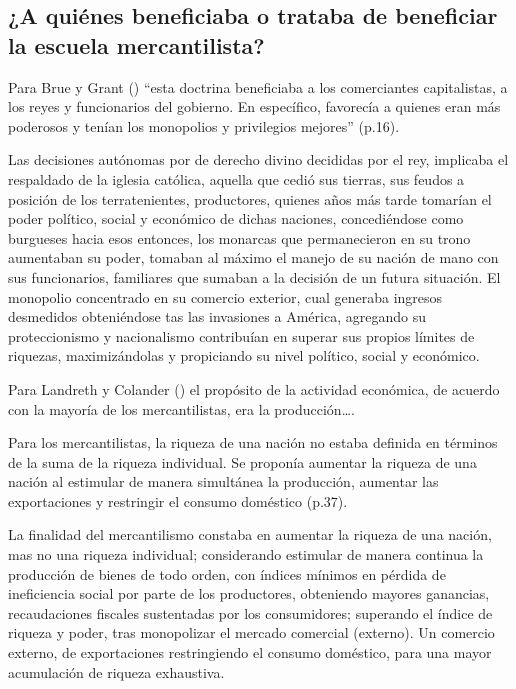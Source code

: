 \documentclass[
  jou,
  floatsintext,
  longtable,
  a4paper,
  nolmodern,
  notxfonts,
  notimes,
  colorlinks=true,linkcolor=blue,citecolor=blue,urlcolor=blue]{apa7}
\begin{document}
\subsection{¿A quiénes beneficiaba o trataba de beneficiar la escuela
mercantilista?}\label{a-quiuxe9nes-beneficiaba-o-trataba-de-beneficiar-la-escuela-mercantilista}

Para Brue y Grant
() ``esta
doctrina beneficiaba a los comerciantes capitalistas, a los reyes y
funcionarios del gobierno. En específico, favorecía a quienes eran más
poderosos y tenían los monopolios y privilegios mejores'' (p.16).

Las decisiones autónomas por de derecho divino decididas por el rey,
implicaba el respaldado de la iglesia católica, aquella que cedió sus
tierras, sus feudos a posición de los terratenientes, productores,
quienes años más tarde tomarían el poder político, social y económico de
dichas naciones, concediéndose como burgueses hacia esos entonces, los
monarcas que permanecieron en su trono aumentaban su poder, tomaban al
máximo el manejo de su nación de mano con sus funcionarios, familiares
que sumaban a la decisión de un futura situación. El monopolio
concentrado en su comercio exterior, cual generaba ingresos desmedidos
obteniéndose tas las invasiones a América, agregando su proteccionismo y
nacionalismo contribuían en superar sus propios límites de riquezas,
maximizándolas y propiciando su nivel político, social y económico.

Para Landreth y Colander
() el propósito
de la actividad económica, de acuerdo con la mayoría de los
mercantilistas, era la producción\ldots.

Para los mercantilistas, la riqueza de una nación no estaba definida en
términos de la suma de la riqueza individual. Se proponía aumentar la
riqueza de una nación al estimular de manera simultánea la producción,
aumentar las exportaciones y restringir el consumo doméstico (p.37).

La finalidad del mercantilismo constaba en aumentar la riqueza de una
nación, mas no una riqueza individual; considerando estimular de manera
continua la producción de bienes de todo orden, con índices mínimos en
pérdida de ineficiencia social por parte de los productores, obteniendo
mayores ganancias, recaudaciones fiscales sustentadas por los
consumidores; superando el índice de riqueza y poder, tras monopolizar
el mercado comercial (externo). Un comercio externo, de exportaciones
restringiendo el consumo doméstico, para una mayor acumulación de
riqueza exhaustiva.
\end{document}
